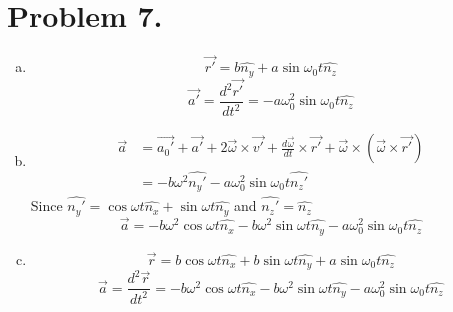 \documentclass{article}
\begin{document}
\section*{Problem 7.}
\begin{enumerate}[(a)]
	\item
	$$\vec{r'}=b\hat{n_y}+a\sin\omega_0t\hat{n_z}$$
	$$\vec{a'}=\frac{d^2\vec{r'}}{dt^2}=-a\omega_0^2\sin\omega_0t\hat{n_z}$$
	\item
	\begin{align*}
	\vec{a}&=\vec{a_0'}+\vec{a'}+2\vec{\omega}\times\vec{v'}+\frac{d\vec{\omega}}{dt}\times\vec{r'}+\vec{\omega}\times(\vec{\omega}\times\vec{r'})\\
	&=-b\omega^2\hat{n_y'}-a\omega_0^2\sin\omega_0t\hat{n_z'}
	\end{align*}
	Since $\hat{n_y'}=\cos\omega t\hat{n_x}+\sin\omega t\hat{n_y}$ and $\hat{n_z'}=\hat{n_z}$
	$$\vec{a}=-b\omega^2\cos\omega t\hat{n_x}-b\omega^2\sin\omega t\hat{n_y}-a\omega_0^2\sin\omega_0t\hat{n_z}$$
	\item
	$$\vec{r}=b\cos\omega t\hat{n_x}+b\sin\omega t\hat{n_y}+a\sin\omega_0t\hat{n_z}$$
	$$\vec{a}=\frac{d^2\vec{r}}{dt^2}=-b\omega^2\cos\omega t\hat{n_x}-b\omega^2\sin\omega t\hat{n_y}-a\omega_0^2\sin\omega_0t\hat{n_z}$$
\end{enumerate}
\end{document}
